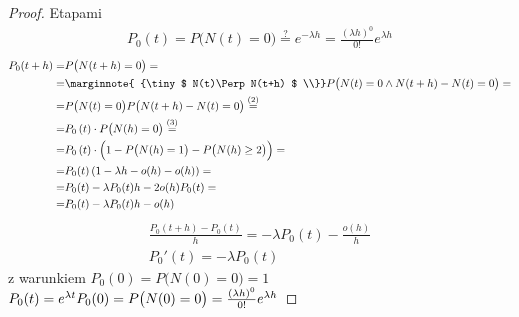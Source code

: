 \begin{proof}
Etapami
\begin{gather*}
P_0(t)=P\bigl(N(t)=0\bigr)\stackrel{?}{=}e^{-\lambda h}=\frac{(\lambda
 h)^0}{0!}e^{\lambda h}
\end{gather*}
\begin{align*}
P_0(t+h)=&
P\bigl(N(t+h)=0\bigr)
=\\=&\marginnote{
{\tiny $ N(t)\Perp N(t+h) $
\\}}
P\bigl(N(t)=0\wedge N(t+h)-N(t)=0\bigr)
=\\=&
P\bigl(N(t)=0\bigr) P\bigl(N(t+h)-N(t)=0\bigr)
\stackrel{(2)}{=}\\=&
P_0\left(t\right)\cdot P\bigl(N(h)=0\bigr)
\stackrel{(3)}{=}\\=&
P_0\left(t\right)\cdot \Bigl(1-P\bigl(N(h)=1\bigr)-P\bigl(N(h)\ge 2\bigr)\Bigr)
=\\=&
P_0(t)\left(1-\lambda h-o(h)-o(h)\right)
=\\=&
P_0(t)-\lambda  P_0(t)h -2 o(h) P_0(t)
=\\=&
P_0(t)-\lambda  P_0(t)h - o(h)
\end{align*}
\begin{gather*}
\frac{P_0(t+h)-P_0(t)}{h}=
-\lambda P_0(t)- \frac{o(h)}{h}\\
P_0'(t)=-\lambda P_0(t)
\end{gather*}
z warunkiem $ P_0(0)=P\bigl(N(0)=0\bigr)=1 $\\
$ P_0(t)=e^{\lambda t} \\
P_0(0)=P\bigl(N(0)=0\bigr)=
\frac{(\lambda h)^0}{0!}e^{\lambda h}$
 

\end{proof}
